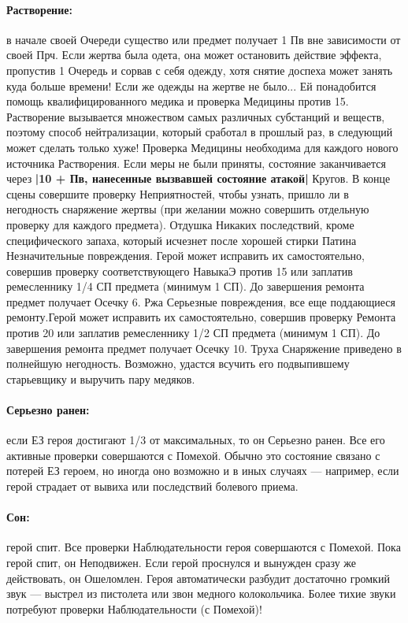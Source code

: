 \paragraph{Растворение:} в начале своей Очереди существо или предмет получает 1 Пв вне зависимости от своей Прч. Если жертва была одета, она может остановить действие эффекта, пропустив 1 Очередь и сорвав с себя одежду, хотя снятие доспеха может занять куда больше времени! Если же одежды на жертве не было... Ей понадобится помощь квалифицированного медика и проверка Медицины против 15. Растворение вызывается множеством самых различных субстанций и веществ, поэтому способ нейтрализации, который сработал в прошлый раз, в следующий может сделать только хуже! Проверка Медицины необходима для каждого нового источника Растворения.
\newline
Если меры не были приняты, состояние заканчивается через \textbf{|10 + Пв, нанесенные вызвавшей состояние атакой|} Кругов. В конце сцены совершите проверку Неприятностей, чтобы узнать, пришло ли в негодность снаряжение жертвы (при желании можно совершить отдельную проверку для каждого предмета).
\trouble
{Отдушка}%
{Никаких последствий, кроме специфического запаха, который исчезнет после хорошей стирки}%
{Патина}%
{Незначительные повреждения. Герой может исправить их самостоятельно, совершив проверку соответствующего НавыкаЭ против 15 или заплатив ремесленнику 1/4 СП предмета (минимум 1 СП). До завершения ремонта предмет получает Осечку 6.}%
{Ржа}%
{Серьезные повреждения, все еще поддающиеся ремонту.Герой может исправить их самостоятельно, совершив проверку Ремонта против 20 или заплатив ремесленнику 1/2 СП предмета (минимум 1 СП). До завершения ремонта предмет получает Осечку 10.}%
{Труха}%
{Снаряжение приведено в полнейшую негодность. Возможно, удастся всучить его подвыпившему старьевщику и выручить пару медяков.}%
\paragraph{Серьезно ранен:} если ЕЗ героя достигают 1/3 от максимальных, то он Серьезно ранен. Все его активные проверки совершаются с Помехой. Обычно это состояние связано с потерей ЕЗ героем, но иногда оно возможно и в иных случаях — например, если герой страдает от вывиха или последствий болевого приема.
\paragraph{Сон:} герой спит. Все проверки Наблюдательности героя совершаются с Помехой. Пока герой спит, он Неподвижен. Если герой проснулся и вынужден сразу же действовать, он Ошеломлен. Героя автоматически разбудит достаточно громкий звук — выстрел из пистолета или звон медного колокольчика. Более тихие звуки потребуют проверки Наблюдательности (с Помехой)!
